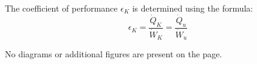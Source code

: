 The coefficient of performance \( \epsilon_K \) is determined using the formula:  
\[
\epsilon_K = \frac{\dot{Q}_K}{\dot{W}_K} = \frac{\dot{Q}_u}{\dot{W}_u}
\]  

No diagrams or additional figures are present on the page.